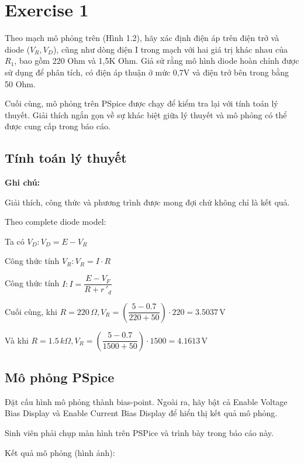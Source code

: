 \section{Exercise 1}

Theo mạch mô phỏng trên (Hình 1.2), hãy xác định điện áp trên điện trở và diode ($V_R, V_D$), cũng như dòng điện I trong mạch với hai giá trị khác nhau của $R_1$, bao gồm 220 Ohm và 1,5K Ohm. Giả sử rằng mô hình diode hoàn chỉnh được sử dụng để phân tích, có điện áp thuận ở mức 0,7V và điện trở bên trong bằng 50 Ohm.

Cuối cùng, mô phỏng trên PSpice được chạy để kiểm tra lại với tính toán lý thuyết. Giải thích ngắn gọn về sự khác biệt giữa lý thuyết và mô phỏng có thể được cung cấp trong báo cáo.

\subsection{Tính toán lý thuyết}

\textbf{Ghi chú:}

Giải thích, công thức và phương trình được mong đợi chứ không chỉ là kết quả.

Theo complete diode model:

Ta có $V_{D} : V_{D} = E - V_{R}$

Công thức tính $V_{R}: V_{R} = I \cdot R$

Công thức tính $I: I = \dfrac{E - V_{F}}{R + r \, ' _d}$

Cuối cùng, khi $R = 220 \, \Omega, V_{R} = \left(\dfrac{5 - 0.7}{220 + 50}\right) \cdot 220 = 3.5037 \, \text{V}$

Và khi $R = 1.5 \, k\Omega, V_{R} = \left(\dfrac{5 - 0.7}{1500 + 50}\right) \cdot 1500 = 4.1613 \, \text{V}$

\subsection{Mô phỏng PSpice}

Đặt cấu hình mô phỏng thành bias-point. Ngoài ra, hãy bật cả Enable Voltage Bias Display và Enable Current Bias Display để hiển thị kết quả mô phỏng.

Sinh viên phải chụp màn hình trên PSPice và trình bày trong báo cáo này.

Kết quả mô phỏng (hình ảnh):

